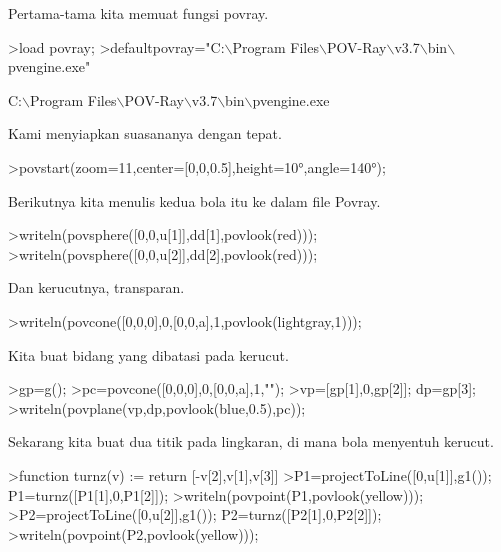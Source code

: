 \documentclass[a4paper,10pt]{article}
\begin{document}
\begin{eulernotebook}
\begin{eulercomment}
\begin{eulercomment}
\begin{eulercomment}
\begin{eulercomment}
\begin{eulercomment}
\begin{eulercomment}
\begin{eulercomment}
\begin{eulercomment}
\begin{eulercomment}
\begin{eulercomment}
\begin{eulercomment}
\begin{eulercomment}
\begin{eulercomment}
\begin{eulercomment}
\begin{eulercomment}
\begin{eulercomment}
\begin{eulercomment}
\begin{eulercomment}
\begin{eulercomment}
Pertama-tama kita memuat fungsi povray.
\end{eulercomment}
\begin{eulerprompt}
>load povray;
>defaultpovray="C:\(\backslash\)Program Files\(\backslash\)POV-Ray\(\backslash\)v3.7\(\backslash\)bin\(\backslash\)pvengine.exe"
\end{eulerprompt}
\begin{euleroutput}
  C:\(\backslash\)Program Files\(\backslash\)POV-Ray\(\backslash\)v3.7\(\backslash\)bin\(\backslash\)pvengine.exe
\end{euleroutput}
\begin{eulercomment}
Kami menyiapkan suasananya dengan tepat.
\end{eulercomment}
\begin{eulerprompt}
>povstart(zoom=11,center=[0,0,0.5],height=10°,angle=140°);
\end{eulerprompt}
\begin{eulercomment}
Berikutnya kita menulis kedua bola itu ke dalam file Povray.
\end{eulercomment}
\begin{eulerprompt}
>writeln(povsphere([0,0,u[1]],dd[1],povlook(red)));
>writeln(povsphere([0,0,u[2]],dd[2],povlook(red)));
\end{eulerprompt}
\begin{eulercomment}
Dan kerucutnya, transparan.
\end{eulercomment}
\begin{eulerprompt}
>writeln(povcone([0,0,0],0,[0,0,a],1,povlook(lightgray,1)));
\end{eulerprompt}
\begin{eulercomment}
Kita buat bidang yang dibatasi pada kerucut.
\end{eulercomment}
\begin{eulerprompt}
>gp=g();
>pc=povcone([0,0,0],0,[0,0,a],1,"");
>vp=[gp[1],0,gp[2]]; dp=gp[3];
>writeln(povplane(vp,dp,povlook(blue,0.5),pc));
\end{eulerprompt}
\begin{eulercomment}
Sekarang kita buat dua titik pada lingkaran, di mana bola menyentuh
kerucut.
\end{eulercomment}
\begin{eulerprompt}
>function turnz(v) := return [-v[2],v[1],v[3]]
>P1=projectToLine([0,u[1]],g1()); P1=turnz([P1[1],0,P1[2]]);
>writeln(povpoint(P1,povlook(yellow)));
>P2=projectToLine([0,u[2]],g1()); P2=turnz([P2[1],0,P2[2]]);
>writeln(povpoint(P2,povlook(yellow)));

\end{eulerprompt}
\end{eulercomment}
\end{eulercomment}
\end{eulercomment}
\end{eulercomment}
\end{eulercomment}
\end{eulercomment}
\end{eulercomment}
\end{eulercomment}
\end{eulercomment}
\end{eulercomment}
\end{eulercomment}
\end{eulercomment}
\end{eulercomment}
\end{eulercomment}
\end{eulercomment}
\end{eulercomment}
\end{eulercomment}
\end{eulercomment}
\end{eulernotebook}
\end{document}

